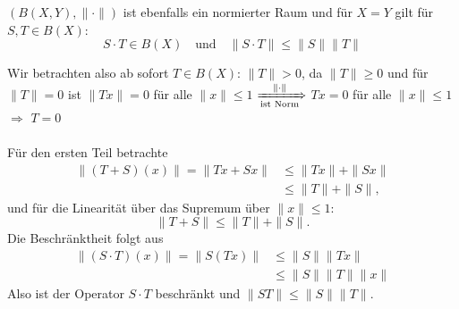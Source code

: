 \begin{satz}
 	$(B(X, Y), \| \cdot \|)$ ist ebenfalls ein normierter Raum und für $X = Y$ gilt für $S, T \in B(X)$:
 	\[ S \cdot T \in B(X) \quad \text{und} \quad \| S \cdotp T \| \leq \| S \| \| T \| \]
\end{satz}

\begin{beweis}
	Wir betrachten also ab sofort $T \in B(X)$: $\| T \| > 0$, da $\| T \| \geq 0$ und für $\| T \| = 0$ ist $\| Tx \| = 0$ für alle $\| x \| \leq 1$ $\xRightarrow[\text{ist Norm}]{\| \cdot \| }$ $Tx = 0$ für alle $\| x \| \leq 1$ $\Rightarrow$ $T = 0$ \\ \\
	Für den ersten Teil betrachte 
	\begin{align*}
		\| ( T + S )(x) \| = \| Tx + Sx \| &\leq \| Tx \| + \| Sx \| \\
										   &\leq \| T \| + \| S \|,
	\end{align*}
	und für die Linearität über das Supremum über $\| x \| \leq 1$:
	\[ \| T + S \| \leq \| T \| + \| S \|. \]
	Die Beschränktheit folgt aus
	\begin{align*}
		\| ( S \cdot T )(x) \| = \| S(Tx) \| & \leq \| S \| \| Tx \| \\
													 & \leq \| S \| \| T \| \| x \|
	\end{align*}
	Also ist der Operator $S \cdot T$ beschränkt und $\| S T \| \leq \| S \| \| T \|$.
\end{beweis}



